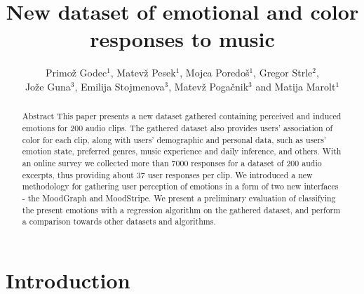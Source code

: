 \documentclass[a4paper]{article}
\begin{document}
\title{New dataset of emotional and color responses to music}

\author{Primož Godec$^{1}$, Matevž Pesek$^{1}$, Mojca Poredoš$^{1}$, Gregor Strle$^{2}$,\\ Jože Guna$^{3}$, Emilija Stojmenova$^{3}$, Matevž Pogačnik$^{3}$ and Matija Marolt$^{1}$} %



\maketitle

\begin{abstract}{Abstract}
This paper presents a new dataset gathered containing perceived and induced emotions for 200 audio clips. The gathered dataset also provides users' association of color for each clip, along with users' demographic and personal data, such as users' emotion state, preferred genres, music experience and daily inference, and others. With an online survey we collected more than 7000 responses for a dataset of 200 audio excerpts, thus providing about 37 user responses per clip. We introduced a new methodology for gathering user perception of emotions in a form of two new interfaces - the MoodGraph and MoodStripe. We present a preliminary evaluation of classifying the present emotions with a regression algorithm on the gathered dataset, and perform a comparison towards other datasets and algorithms.
\end{abstract}

\section{Introduction}
\end{document}
